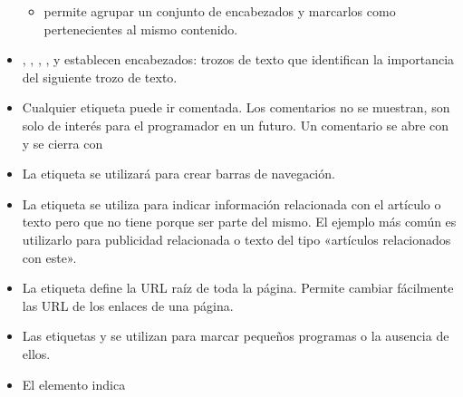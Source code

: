 \documentclass[letterpaper,10pt,spanish]{sphinxmanual}
\begin{document}
\begin{itemize}
\begin{itemize}
\item {} 
 permite agrupar un conjunto de encabezados y marcarlos como pertenecientes al mismo contenido.

\end{itemize}

\item {} 
, , , ,  y  establecen encabezados: trozos de texto que identifican la importancia del siguiente trozo de texto.

\item {} 
Cualquier etiqueta puede ir comentada. Los comentarios no se muestran, son solo de interés para el programador en un futuro. Un comentario se abre con \sphinxcode{\textless{}!-{-}} y se cierra con \sphinxcode{-{-}\textgreater{}}

\item {} 
La etiqueta  se utilizará para crear barras de navegación.

\item {} 
La etiqueta  se utiliza para indicar información relacionada con el artículo o texto pero que no tiene porque ser parte del mismo. El ejemplo más común es utilizarlo para publicidad relacionada o texto del tipo «artículos relacionados con este».

\item {} 
La etiqueta  define la URL raíz de toda la página. Permite cambiar fácilmente las URL de los enlaces de una página.

\item {} 
Las etiquetas  y  se utilizan para marcar pequeños programas o la ausencia de ellos.

\item {} 
El elemento  indica 

\end{itemize}
\end{document}
